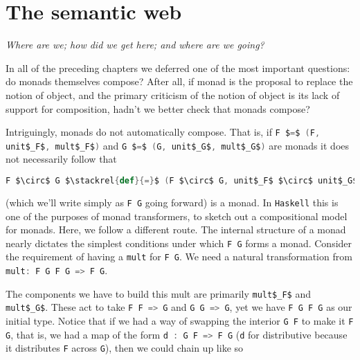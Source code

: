 

\chapter{The semantic web}
\begin{center}
{\small\em Where are we; how did we get here; and where are we going?}
\end{center}

In all of the preceding chapters we deferred one of the most important
questions: do monads themselves compose? After all, if monad is the
proposal to replace the notion of object, and the primary criticism of
the notion of object is its lack of support for composition, hadn't we
better check that monads compose?

Intriguingly, monads do not automatically compose. That is, if
\lstinline[language=Scala,mathescape=true]!F $=$ (F, unit$_F$, mult$_F$)!
and \lstinline[language=Scala,mathescape=true]!G $=$ (G, unit$_G$, mult$_G$)!
are monads it does not necessarily follow that

\begin{lstlisting}[language=Scala,mathescape=true]
  F $\circ$ G $\stackrel{def}{=}$ (F $\circ$ G, unit$_F$ $\circ$ unit$_G$, mult$_f$ $\circ$ mult$_G$)
\end{lstlisting}

(which we'll write simply as
\lstinline[language=Scala,mathescape=true]!F G! going forward) is a
monad. In \texttt{Haskell} this is one of the purposes of monad
transformers, to sketch out a compositional model for monads. Here, we
follow a different route. The internal structure of a monad nearly
dictates the simplest conditions under which
\lstinline[language=Scala,mathescape=true]!F G! forms a
monad. Consider the requirement of having a
\lstinline[language=Scala,mathescape=true]!mult! for
\lstinline[language=Scala,mathescape=true]!F G!. We need a natural
transformation from \lstinline[language=Scala,mathescape=true]!mult: F G F G => F G!.

The components we have to build this mult are primarily
\lstinline[language=Scala,mathescape=true]!mult$_F$! and
\lstinline[language=Scala,mathescape=true]!mult$_G$!. These act to
take \lstinline[language=Scala,mathescape=true]!F F => G! and
\lstinline[language=Scala,mathescape=true]!G G => G!, yet we have
\lstinline[language=Scala,mathescape=true]!F G F G! as our initial
type. Notice that if we had a way of swapping the interior
\lstinline[language=Scala,mathescape=true]!G F! to make it
\lstinline[language=Scala,mathescape=true]!F G!, that is, we had a map
of the form \lstinline[language=Scala,mathescape=true]!d : G F => F G!
(\lstinline[language=Scala,mathescape=true]!d! for distributive
because it distributes \lstinline[language=Scala,mathescape=true]!F!
across \lstinline[language=Scala,mathescape=true]!G!), then we could
chain up like so

